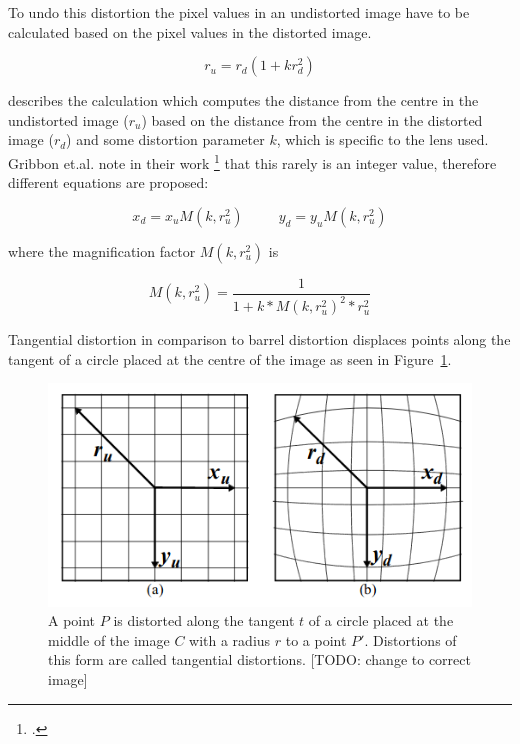 To undo this distortion the pixel values in an undistorted image have to be calculated based on the pixel values in the distorted image.

\begin{equation}
r_u = r_d(1+k r_d^2)
\end{equation}

describes the calculation which computes the distance from the centre in the undistorted image ($r_u$) based on the distance from the centre in the distorted image ($r_d$) and some distortion parameter $k$, which is specific to the lens used. Gribbon et.al. note in their work \footcite{Gribbon_Barrel_Distortion_Correction_Algorithm} that this rarely is an integer value, therefore different equations are proposed:

\begin{equation}
x_d = x_u M(k,r_u^2) \hspace{30pt} y_d = y_u M(k, r_u^2)
\end{equation}

where the magnification factor $M(k,r_u^2)$ is

\begin{equation}
M(k,r_u^2) = \frac{1}{1+k * M(k,r_u^2)^2 * r_u^2}
\end{equation}

Tangential distortion in comparison to barrel distortion displaces points along the tangent of a circle placed at the centre of the image as seen in Figure~\ref{pic:methodology_stereoCamera_distortion_tangentialDistortion}.

\begin{figure}[h!]
	\centering
	\includegraphics[width=4.5in]{img/methodology_stereoCamera_distortion_tangentialDistortion.png}
	\caption{A point $P$ is distorted along the tangent $t$ of a circle placed at the middle of the image $C$ with a radius $r$ to a point $P'$. Distortions of this form are called tangential distortions. [TODO: change to correct image]}
	\label{pic:methodology_stereoCamera_distortion_tangentialDistortion}
\end{figure}

